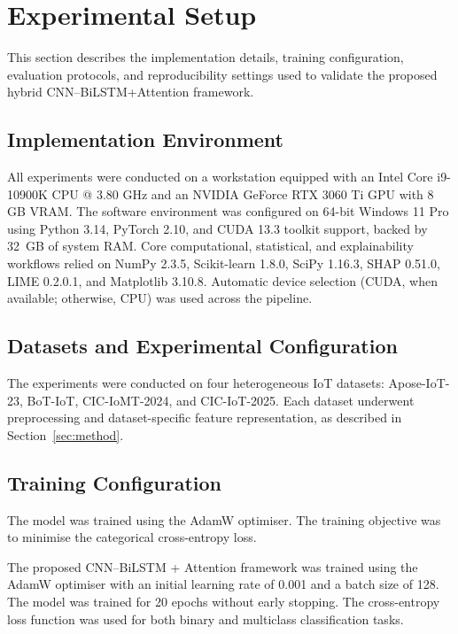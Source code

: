 \documentclass[a4paper,fleqn]{cas-sc}
\begin{document}
\section{Experimental Setup}
\label{sec:setup}

This section describes the implementation details, training configuration, evaluation protocols, and reproducibility settings used to validate the proposed hybrid CNN--BiLSTM+Attention framework.

\subsection{Implementation Environment}

{\color{blue}All experiments were conducted on a workstation equipped with an Intel Core i9-10900K CPU @ 3.80 GHz and an NVIDIA GeForce RTX 3060 Ti GPU with 8 GB VRAM. The software environment was configured on 64-bit Windows 11 Pro using Python 3.14, PyTorch 2.10, and CUDA 13.3 toolkit support, backed by 32~GB of system RAM. Core computational, statistical, and explainability workflows relied on NumPy 2.3.5, Scikit-learn 1.8.0, SciPy 1.16.3, SHAP 0.51.0, LIME 0.2.0.1, and Matplotlib 3.10.8. Automatic device selection (CUDA, when available; otherwise, CPU) was used across the pipeline.} 

\subsection{Datasets and Experimental Configuration}

The experiments were conducted on four heterogeneous IoT datasets: Apose-IoT-23, BoT-IoT, CIC-IoMT-2024, and CIC-IoT-2025. Each dataset underwent preprocessing and dataset-specific feature representation, as described in Section~\ref{sec:method}. 

\subsection{Training Configuration}

The model was trained using the AdamW optimiser. The training objective was to minimise the categorical cross-entropy loss.

{\color{blue}The proposed CNN--BiLSTM + Attention framework was trained using the AdamW optimiser with an initial learning rate of 0.001 and a batch size of 128.} The model was trained for 20 epochs without early stopping. The cross-entropy loss function was used for both binary and multiclass classification tasks.
\end{document}

